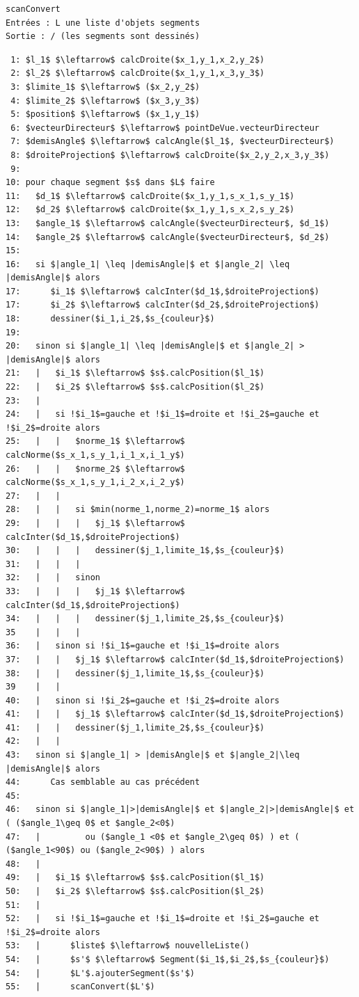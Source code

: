 \documentclass[11pt,a4paper]{article}
\theoremstyle{definition}
\theoremstyle{remark}
\begin{document}
\begin{lstlisting}
scanConvert
Entrées : L une liste d'objets segments
Sortie : / (les segments sont dessinés)
\end{lstlisting}


\begin{lstlisting}
 1: $l_1$ $\leftarrow$ calcDroite($x_1,y_1,x_2,y_2$)
 2: $l_2$ $\leftarrow$ calcDroite($x_1,y_1,x_3,y_3$)
 3: $limite_1$ $\leftarrow$ ($x_2,y_2$)
 4: $limite_2$ $\leftarrow$ ($x_3,y_3$)
 5: $position$ $\leftarrow$ ($x_1,y_1$)
 6: $vecteurDirecteur$ $\leftarrow$ pointDeVue.vecteurDirecteur
 7: $demisAngle$ $\leftarrow$ calcAngle($l_1$, $vecteurDirecteur$)
 8: $droiteProjection$ $\leftarrow$ calcDroite($x_2,y_2,x_3,y_3$)
 9: 
10: pour chaque segment $s$ dans $L$ faire
11:   $d_1$ $\leftarrow$ calcDroite($x_1,y_1,s_x_1,s_y_1$)
12:   $d_2$ $\leftarrow$ calcDroite($x_1,y_1,s_x_2,s_y_2$)
13:   $angle_1$ $\leftarrow$ calcAngle($vecteurDirecteur$, $d_1$)
14:   $angle_2$ $\leftarrow$ calcAngle($vecteurDirecteur$, $d_2$)
15:
16:   si $|angle_1| \leq |demisAngle|$ et $|angle_2| \leq |demisAngle|$ alors
17:      $i_1$ $\leftarrow$ calcInter($d_1$,$droiteProjection$)
17:      $i_2$ $\leftarrow$ calcInter($d_2$,$droiteProjection$)
18:      dessiner($i_1,i_2$,$s_{couleur}$)
19:
20:   sinon si $|angle_1| \leq |demisAngle|$ et $|angle_2| > |demisAngle|$ alors
21:   |   $i_1$ $\leftarrow$ $s$.calcPosition($l_1$)
22:   |   $i_2$ $\leftarrow$ $s$.calcPosition($l_2$)
23:   |
24:   |   si !$i_1$=gauche et !$i_1$=droite et !$i_2$=gauche et !$i_2$=droite alors
25:   |   |   $norme_1$ $\leftarrow$ calcNorme($s_x_1,s_y_1,i_1_x,i_1_y$)
26:   |   |   $norme_2$ $\leftarrow$ calcNorme($s_x_1,s_y_1,i_2_x,i_2_y$)
27:   |   |   
28:   |   |   si $min(norme_1,norme_2)=norme_1$ alors
29:   |   |   |   $j_1$ $\leftarrow$ calcInter($d_1$,$droiteProjection$)
30:   |   |   |   dessiner($j_1,limite_1$,$s_{couleur}$)
31:   |   |   |
32:   |   |   sinon
33:   |   |   |   $j_1$ $\leftarrow$ calcInter($d_1$,$droiteProjection$)
34:   |   |   |   dessiner($j_1,limite_2$,$s_{couleur}$)
35    |   |   |
36:   |   sinon si !$i_1$=gauche et !$i_1$=droite alors
37:   |   |   $j_1$ $\leftarrow$ calcInter($d_1$,$droiteProjection$)
38:   |   |   dessiner($j_1,limite_1$,$s_{couleur}$)
39    |   |
40:   |   sinon si !$i_2$=gauche et !$i_2$=droite alors
41:   |   |   $j_1$ $\leftarrow$ calcInter($d_1$,$droiteProjection$)
41:   |   |   dessiner($j_1,limite_2$,$s_{couleur}$)
42:   |   |
43:   sinon si $|angle_1| > |demisAngle|$ et $|angle_2|\leq |demisAngle|$ alors
44:      Cas semblable au cas précédent
45:
46:   sinon si $|angle_1|>|demisAngle|$ et $|angle_2|>|demisAngle|$ et ( ($angle_1\geq 0$ et $angle_2<0$)
47:   |         ou ($angle_1 <0$ et $angle_2\geq 0$) ) et ( ($angle_1<90$) ou ($angle_2<90$) ) alors
48:   |
49:   |   $i_1$ $\leftarrow$ $s$.calcPosition($l_1$)
50:   |   $i_2$ $\leftarrow$ $s$.calcPosition($l_2$)
51:   |
52:   |   si !$i_1$=gauche et !$i_1$=droite et !$i_2$=gauche et !$i_2$=droite alors
53:   |      $liste$ $\leftarrow$ nouvelleListe()
54:   |      $s'$ $\leftarrow$ Segment($i_1$,$i_2$,$s_{couleur}$)
54:   |      $L'$.ajouterSegment($s'$)
55:   |      scanConvert($L'$)
\end{lstlisting}
\restoregeometry
\end{document}
